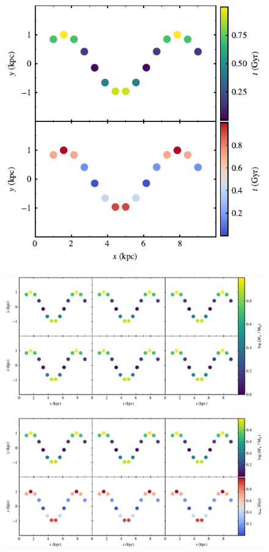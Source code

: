 \documentclass[usenatbib]{mnras}
\begin{document}
\lipsum[1-3]

\begin{figure}
\includegraphics{../pdf/006.pdf}
\caption[]{\lipsum[66]}
\label{fig006}
\end{figure}

\lipsum[1-3]

\begin{figure}
\includegraphics{../pdf/007.pdf}
\caption[]{\lipsum[66]}
\label{fig007}
\end{figure}

\lipsum[1-3]

\begin{figure}
\includegraphics{../pdf/008.pdf}
\caption[]{\lipsum[66]}
\label{fig008}
\end{figure}
\end{document}
